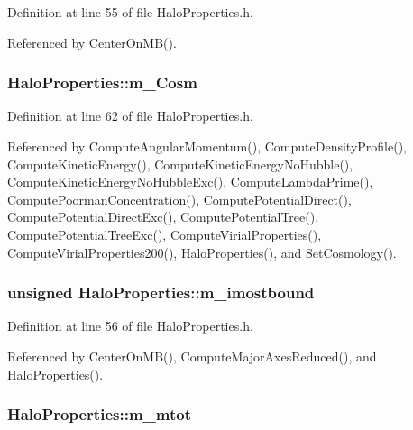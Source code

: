 Definition at line 55 of file HaloProperties.h.



Referenced by CenterOnMB().

\subsubsection[{m\_\-Cosm}]{ {\bf HaloProperties::m\_\-Cosm}}\label{classHaloProperties_ac5f3f646bdff517eced133857ad03a0d}


Definition at line 62 of file HaloProperties.h.



Referenced by ComputeAngularMomentum(), ComputeDensityProfile(), ComputeKineticEnergy(), ComputeKineticEnergyNoHubble(), ComputeKineticEnergyNoHubbleExc(), ComputeLambdaPrime(), ComputePoormanConcentration(), ComputePotentialDirect(), ComputePotentialDirectExc(), ComputePotentialTree(), ComputePotentialTreeExc(), ComputeVirialProperties(), ComputeVirialProperties200(), HaloProperties(), and SetCosmology().

\subsubsection[{m\_\-imostbound}]{\setlength{\rightskip}{0pt plus 5cm}unsigned {\bf HaloProperties::m\_\-imostbound}}\label{classHaloProperties_aaf7437a2b095bad02f2c423d834fbec2}


Definition at line 56 of file HaloProperties.h.



Referenced by CenterOnMB(), ComputeMajorAxesReduced(), and HaloProperties().

\subsubsection[{m\_\-mtot}]{ {\bf HaloProperties::m\_\-mtot}}\label{classHaloProperties_a49159fd8ceb9bcb6693ed3a3070320b5}


